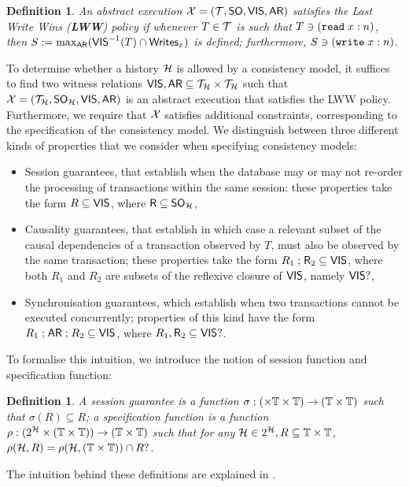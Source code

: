 \documentclass[a4paper,UKenglish]{article}%
\newtheorem{definition}[theorem]{Definition}
\theoremstyle{plain}
\begin{document}
\begin{definition}
An abstract execution $\mathcal{X} = (\mathcal{T}, {\sf{SO}}, {\mathsf{VIS}}, {\sf{AR}})$ satisfies the \emph{Last Write Wins} ({\bf LWW}) 
policy if whenever $T \in \mathcal{T}$ is such that $T \ni ({{\tt read}}\;x:n)$, then $S := \max_{{\sf{AR}}}({\mathsf{VIS}}^{-1}(T) \cap {\sf{Writes}}_x)$ 
is defined; furthermore, $S \ni ({{\tt write}}\;x:n)$.
\end{definition}

To determine whether a history $\mathcal{H}$ is allowed by a consistency model, it suffices 
to find two witness relations ${\mathsf{VIS}}, {\sf{AR}} \subseteq \mathcal{T}_{\mathcal{H}} \times \mathcal{T}_{\mathcal{H}}$ 
such that $\mathcal{X} = (\mathcal{T}_{\mathcal{H}}, {\sf{SO}}_{\mathcal{H}}, {\mathsf{VIS}}, {\sf{AR}})$ is an abstract execution 
that satisfies the LWW policy. Furthermore, we require that $\mathcal{X}$ satisfies additional 
constraints, corresponding to the specification of the consistency model. 
We distinguish between three different kinds of properties that we consider 
when specifying consistency models: 
\begin{itemize}
\item Session guarantees, that establish when the database may or may 
not re-order the processing of transactions within the same session: 
these properties take the form $R \subseteq {\mathsf{VIS}}$, where $\mathsf{R} \subseteq {\sf{SO}}_{\mathcal{H}}$, 
\item Causality guarantees, that establish in which case a relevant subset of the causal dependencies of a 
transaction observed by $T$, must also be observed by the same transaction; these properties 
take the form $R_1 \mathrel{;} \mathsf{R}_2 \subseteq {\mathsf{VIS}}$, where both $R_1$ and $R_2$ are subsets 
of the reflexive closure of ${\mathsf{VIS}}$, namely ${\mathsf{VIS}}?$, 
\item Synchronisation guarantees, which establish when two transactions cannot be executed 
concurrently; properties of this kind have the form $R_1 \mathrel{;} {\sf{AR}} \mathrel{;} R_2 \subseteq {\mathsf{VIS}}$, 
where $R_1, \mathsf{R}_2 \subseteq {\mathsf{VIS}}?$.
\end{itemize}

To formalise this intuition, we introduce the notion of session function and specification function: 
\begin{definition}
A session guarantee is a function $\sigma: (\times \mathbb{T} \times \mathbb{T}) \rightarrow (\mathbb{T} \times \mathbb{T})$ 
such that $\sigma(R) \subseteq R$; 
a specification function is a function $\rho: (2^{\mathcal{H}} \times (\mathbb{T} \times \mathbb{T})) \rightarrow (\mathbb{T} \times \mathbb{T})$ 
such that for any $\mathcal{H} \in 2^{\mathcal{H}}, R \subseteq \mathbb{T} \times \mathbb{T}$, $\rho(\mathcal{H}, R) = \rho(\mathcal{H}, (\mathbb{T} \times \mathbb{T})) \cap R?$. 
\end{definition}
The intuition behind these definitions are explained in \cite{laws}. 
\end{document}
